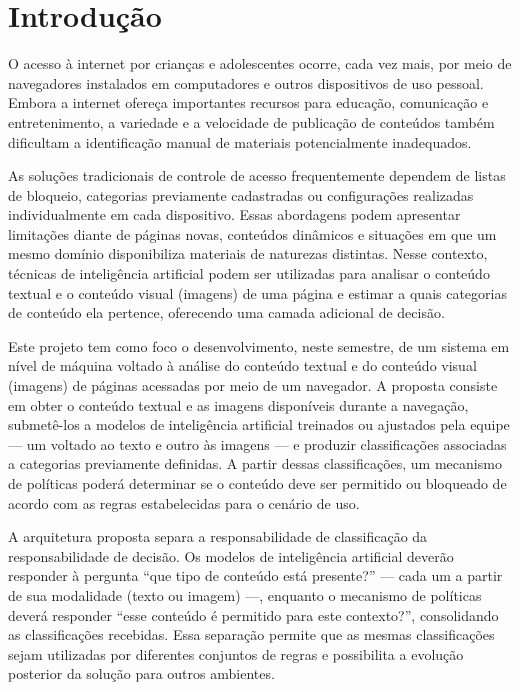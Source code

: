 \documentclass[
    12pt,           %
    oneside,        %
    a4paper,        %
    chapter=TITLE,  %
    english,        %
    brazil          %
]{abntex2}
\begin{document}
\tableofcontents*
\cleardoublepage
\textual
\pagestyle{simple}

\chapter{Introdução}

O acesso à internet por crianças e adolescentes ocorre, cada vez mais, por meio
de navegadores instalados em computadores e outros dispositivos de uso pessoal.
Embora a internet ofereça importantes recursos para educação, comunicação e
entretenimento, a variedade e a velocidade de publicação de conteúdos também
dificultam a identificação manual de materiais potencialmente inadequados.

As soluções tradicionais de controle de acesso frequentemente dependem de
listas de bloqueio, categorias previamente cadastradas ou configurações
realizadas individualmente em cada dispositivo. Essas abordagens podem
apresentar limitações diante de páginas novas, conteúdos dinâmicos e situações
em que um mesmo domínio disponibiliza materiais de naturezas distintas. Nesse
contexto, técnicas de inteligência artificial podem ser utilizadas para analisar
o conteúdo textual e o conteúdo visual (imagens) de uma página e estimar a
quais categorias de conteúdo ela pertence, oferecendo uma camada adicional de
decisão.

Este projeto tem como foco o desenvolvimento, neste semestre, de um sistema em
nível de máquina voltado à análise do conteúdo textual e do conteúdo visual
(imagens) de páginas acessadas por meio de um navegador. A proposta consiste
em obter o conteúdo textual e as imagens disponíveis durante a navegação,
submetê-los a modelos de inteligência artificial treinados ou ajustados pela
equipe — um voltado ao texto e outro às imagens — e produzir classificações
associadas a categorias previamente definidas. A partir dessas classificações,
um mecanismo de políticas poderá determinar se o conteúdo deve ser permitido
ou bloqueado de acordo com as regras estabelecidas para o cenário de uso.

A arquitetura proposta separa a responsabilidade de classificação da
responsabilidade de decisão. Os modelos de inteligência artificial deverão
responder à pergunta ``que tipo de conteúdo está presente?'' — cada um a
partir de sua modalidade (texto ou imagem) —, enquanto o mecanismo de
políticas deverá responder ``esse conteúdo é permitido para este contexto?'',
consolidando as classificações recebidas. Essa separação permite que as
mesmas classificações sejam utilizadas por diferentes conjuntos de regras e
possibilita a evolução posterior da solução para outros ambientes.
\end{document}

